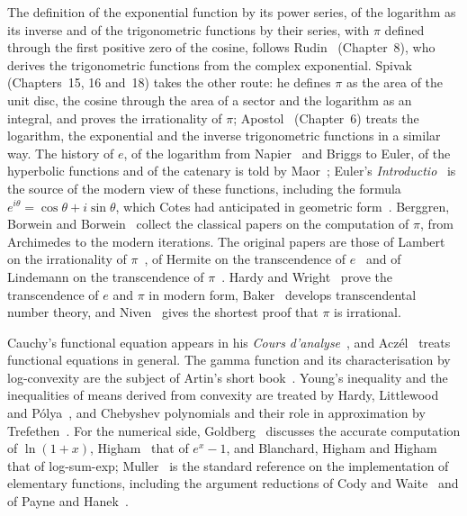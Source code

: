 The definition of the exponential function by its power series, of the logarithm as its inverse and of the trigonometric functions by their series, with $\pi$ defined through the first positive zero of the cosine, follows Rudin~\cite{rudin1976} (Chapter~8), who derives the trigonometric functions from the complex exponential. Spivak~\cite{spivak2008calculus} (Chapters~15, 16 and~18) takes the other route: he defines $\pi$ as the area of the unit disc, the cosine through the area of a sector and the logarithm as an integral, and proves the irrationality of $\pi$; Apostol~\cite{apostol1967calculus} (Chapter~6) treats the logarithm, the exponential and the inverse trigonometric functions in a similar way. The history of $e$, of the logarithm from Napier~\cite{napier1614} and Briggs to Euler, of the hyperbolic functions and of the catenary is told by Maor~\cite{maor1994}; Euler's \emph{Introductio}~\cite{euler1748introductio} is the source of the modern view of these functions, including the formula $e^{i\theta}=\cos\theta+i\sin\theta$, which Cotes had anticipated in geometric form~\cite{cotes1714}. Berggren, Borwein and Borwein~\cite{berggren2004pi} collect the classical papers on the computation of $\pi$, from Archimedes to the modern iterations. The original papers are those of Lambert on the irrationality of $\pi$~\cite{lambert1768}, of Hermite on the transcendence of $e$~\cite{hermite1873} and of Lindemann on the transcendence of $\pi$~\cite{lindemann1882}. Hardy and Wright~\cite{hardywright2008} prove the transcendence of $e$ and $\pi$ in modern form, Baker~\cite{baker1975} develops transcendental number theory, and Niven~\cite{niven1947} gives the shortest proof that $\pi$ is irrational.

Cauchy's functional equation appears in his \emph{Cours d'analyse}~\cite{cauchy1821}, and Acz\'el~\cite{aczel1966} treats functional equations in general. The gamma function and its characterisation by log-convexity are the subject of Artin's short book~\cite{artin1964gamma}. Young's inequality and the inequalities of means derived from convexity are treated by Hardy, Littlewood and P\'olya~\cite{hardy1952inequalities}, and Chebyshev polynomials and their role in approximation by Trefethen~\cite{trefethen2013atap}. For the numerical side, Goldberg~\cite{goldberg1991} discusses the accurate computation of $\ln(1+x)$, Higham~\cite{higham2002accuracy} that of $e^x-1$, and Blanchard, Higham and Higham~\cite{blanchard2021logsumexp} that of log-sum-exp; Muller~\cite{muller2016elementary} is the standard reference on the implementation of elementary functions, including the argument reductions of Cody and Waite~\cite{cody1980} and of Payne and Hanek~\cite{payne1983}.

\chapterreferences
